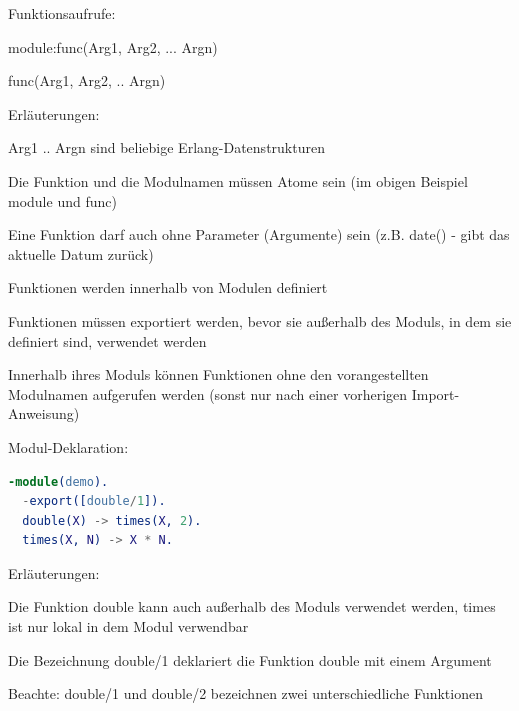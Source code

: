 \documentclass[10pt]{article}
\begin{document}
Funktionsaufrufe:
\begin{itemize*}
  \item module:func(Arg1, Arg2, ... Argn)
  \item func(Arg1, Arg2, .. Argn)
  \item Erläuterungen:
  \begin{itemize*}
    \item Arg1 .. Argn sind beliebige Erlang-Datenstrukturen
    \item Die Funktion und die Modulnamen müssen Atome sein (im obigen Beispiel module und func)
    \item Eine Funktion darf auch ohne Parameter (Argumente) sein (z.B. date() - gibt das aktuelle Datum zurück)
    \item Funktionen werden innerhalb von Modulen definiert
    \item Funktionen müssen exportiert werden, bevor sie außerhalb des Moduls, in dem sie definiert sind, verwendet werden
    \item Innerhalb ihres Moduls können Funktionen ohne den vorangestellten Modulnamen aufgerufen werden (sonst nur nach einer vorherigen Import-Anweisung)
  \end{itemize*}
\end{itemize*}

Modul-Deklaration:
\begin{lstlisting}[language=erlang]
  -module(demo).
  -export([double/1]).
  double(X) -> times(X, 2).
  times(X, N) -> X * N.
\end{lstlisting}
\begin{itemize*}
  \item Erläuterungen:
  \item Die Funktion double kann auch außerhalb des Moduls verwendet werden, times ist nur lokal in dem Modul verwendbar
  \item Die Bezeichnung double/1 deklariert die Funktion double mit einem Argument
  \item Beachte: double/1 und double/2 bezeichnen zwei unterschiedliche Funktionen
\end{itemize*}
\end{document}
